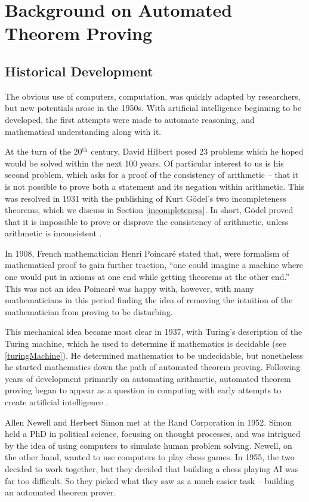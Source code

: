 \chapter{Background on Automated Theorem Proving}

\section{Historical Development}

The obvious use of computers, computation, was quickly adapted by researchers, but new potentials arose in the 1950s. With artificial intelligence beginning to be developed, the first attempts were made to automate reasoning, and mathematical understanding along with it.

At the turn of the 20$^{\text{th}}$ century, David Hilbert posed 23 problems which he hoped would be solved within the next 100 years. Of particular interest to us is his second problem, which asks for a proof of the consistency of arithmetic -- that it is not possible to prove both a statement and its negation within arithmetic. This was resolved in 1931 with the publishing of Kurt G\"odel's two incompleteness theorems, which we discuss in Section \ref{incompleteness}. In short, G\"odel proved that it is impossible to prove or disprove the consistency of arithmetic, unless arithmetic is inconsistent \cite{godel}.

In 1908, French mathematician Henri Poincar\'e stated that, were formalism of mathematical proof to gain further traction, ``one could imagine a machine where one would put in axioms at one end while getting theorems at the other end.'' This was not an idea Poincar\'e was happy with, however, with many mathematicians in this period finding the idea of removing the intuition of the mathematician from proving to be disturbing.

This mechanical idea became most clear in 1937, with Turing's description of the Turing machine, which he used to determine if mathematics is decidable (see \ref{turingMachine}). He determined mathematics to be undecidable, but nonetheless he started mathematics down the path of automated theorem proving. Following years of development primarily on automating arithmetic, automated theorem proving began to appear as a question in computing with early attempts to create artificial intelligence \cite{history}.

Allen Newell and Herbert Simon met at the Rand Corporation in 1952. Simon held a PhD in political science, focusing on thought processes, and was intrigued by the idea of using computers to simulate human problem solving. Newell, on the other hand, wanted to use computers to play chess games. In 1955, the two decided to work together, but they decided that building a chess playing AI was far too difficult. So they picked what they saw as a much easier task -- building an automated theorem prover.


